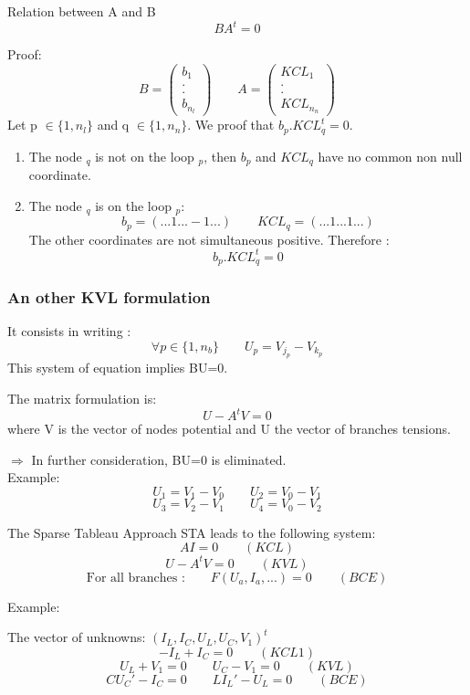 \frame
{
\begin{block}{Relation between A and B}
\[BA^{t}=0\]
\end{block}
\pause
Proof:
\[B=\left(\begin{array}{c}b_{1}\\.\\.\\b_{n_{l}}\end{array}\right)
\qquad A=\left(\begin{array}{c}KCL_{1}\\.\\.\\KCL_{n_{n}}\end{array}\right)\]
Let p $\in \lbrace 1,n_{l} \rbrace $ and q $\in \lbrace 1,n_{n} \rbrace $. We proof that
$b_{p}.KCL_{q}^{t}=0$.
\begin{figure}[h]
\centerline{
 \scalebox{0.5}{
    
 }
}
\end{figure}

\begin{enumerate}
\item The node $_{q}$ is not on the loop $_{p}$, then $b_{p}$ and $KCL_{q}$ have no common non null coordinate.
\item The node $_{q}$ is on the loop $_{p}$:
\[b_{p}=(...1...-1...)\qquad KCL_{q}=(...1...1...)\]
The other coordinates are not simultaneous positive. Therefore :
\[b_{p}.KCL_{q}^{t}=0\]
\end{enumerate}

}
\frame
{
\frametitle{An other KVL formulation}
\begin{figure}[h]
\centerline{
 \scalebox{0.5}{
    
 }
}
\end{figure}
It consists in writing :
\[\forall p \in \lbrace 1,n_{b} \rbrace \qquad U_{p}=V_{j_{p}}-V_{k_{p}}\]
This system of equation implies BU=0.
\begin{block}{The matrix formulation is:}
\[U-A^{t}V=0\]
where V is the vector of nodes potential and U the vector of branches tensions.\\
\end{block}
$\Rightarrow$ In further consideration, BU=0 is eliminated.\\
Example:
\[U_{1}=V_{1} - V_{0} \qquad U_{2} = V_{0}-V_{1}\]
\[U_{3}=V_{2} - V_{1} \qquad U_{4} = V_{0}-V_{2}\]
}


\frame
{
  \begin{block}{The Sparse Tableau Approach STA leads to the following system:}
  \[AI=0 \qquad (KCL)\]
  \[U-A^{t}V=0 \qquad (KVL)\]
  \[\textrm{For all branches :} \qquad F(U_{a},I_{a},...)=0 \qquad(BCE) \]
  \end{block}  


Example:
  \begin{figure}[h]
   \centerline{
   \scalebox{0.5}{
    
  }
 } 
 \end{figure}
 The vector of unknowns: $(I_{L},I_{C},U_{L},U_{C},V_{1})^{t}$
 \[-I_{L} + I_{C} = 0 \qquad (KCL1)\]
 \[U_{L} + V_{1} = 0 \qquad U_{C} -V_{1}=0\qquad (KVL)\]
 \[CU_{C}'-I_{C}=0 \qquad LI_{L}'-U_{L}=0\qquad (BCE)\]
 
  }

